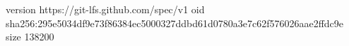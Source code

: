 version https://git-lfs.github.com/spec/v1
oid sha256:295e5034df9e73f86384ec5000327ddbd61d0780a3e7c62f576026aae2ffdc9e
size 138200
